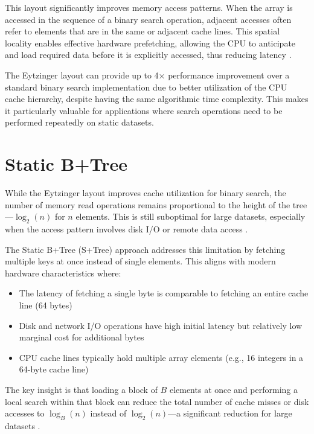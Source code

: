 This layout significantly improves memory access patterns. When the array is accessed in the sequence of a binary search operation, adjacent accesses often refer to elements that are in the same or adjacent cache lines. This spatial locality enables effective hardware prefetching, allowing the CPU to anticipate and load required data before it is explicitly accessed, thus reducing latency \citep{binary_search}.

The Eytzinger layout can provide up to 4× performance improvement over a standard binary search implementation due to better utilization of the CPU cache hierarchy, despite having the same algorithmic time complexity. This makes it particularly valuable for applications where search operations need to be performed repeatedly on static datasets.

\section{Static B+Tree}
\label{tb:static_btree}

While the Eytzinger layout improves cache utilization for binary search, the number of memory read operations remains proportional to the height of the tree—$\log_2(n)$ for $n$ elements. This is still suboptimal for large datasets, especially when the access pattern involves disk I/O or remote data access \citep{static_b_trees}.

The Static B+Tree (S+Tree) approach addresses this limitation by fetching multiple keys at once instead of single elements. This aligns with modern hardware characteristics where:

\begin{itemize}
    \item The latency of fetching a single byte is comparable to fetching an entire cache line (64 bytes)
    \item Disk and network I/O operations have high initial latency but relatively low marginal cost for additional bytes
    \item CPU cache lines typically hold multiple array elements (e.g., 16 integers in a 64-byte cache line)
\end{itemize}

The key insight is that loading a block of $B$ elements at once and performing a local search within that block can reduce the total number of cache misses or disk accesses to $\log_B(n)$ instead of $\log_2(n)$—a significant reduction for large datasets \citep{static_b_trees}.

